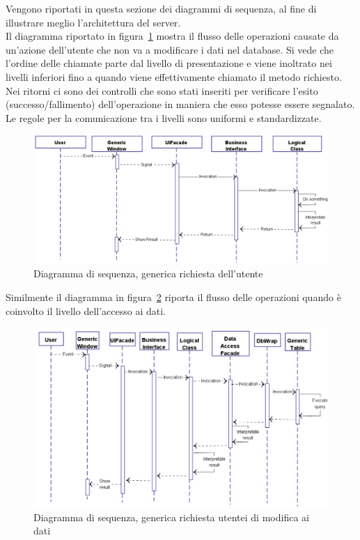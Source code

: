 Vengono riportati in questa sezione dei diagrammi di sequenza, al fine di illustrare meglio l'architettura del server.\\
Il diagramma riportato in figura~\ref{fig:seq1} mostra il flusso delle operazioni causate da un'azione dell'utente che non va a modificare i dati nel database. Si vede che l'ordine delle chiamate parte dal livello di presentazione e viene inoltrato nei livelli inferiori fino a quando viene effettivamente chiamato il metodo richiesto. Nei ritorni ci sono dei controlli che sono stati inseriti per verificare l'esito (successo/fallimento) dell'operazione in maniera che esso potesse essere segnalato. Le regole per la comunicazione tra i livelli sono uniformi e standardizzate. \\
\begin{figure}[!h]
\centering
\includegraphics[scale=0.4]{./images/seq1.png}
\caption{Diagramma di sequenza, generica richiesta dell'utente}
\label{fig:seq1}
\end{figure}
Similmente il diagramma in figura~\ref{fig:seq2} riporta il flusso delle operazioni quando è coinvolto il livello dell'accesso ai dati.
\begin{figure}[!h]
\centering
\includegraphics[scale=0.4]{./images/seq2.png}
\caption{Diagramma di sequenza, generica richiesta utentei di  modifica ai dati}
\label{fig:seq2}
\end{figure}